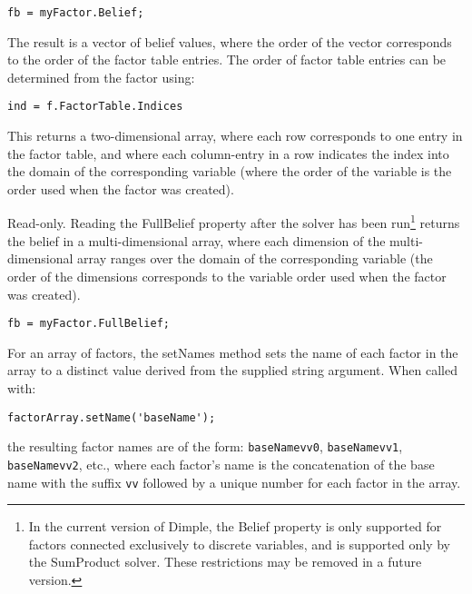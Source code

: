 \begin{lstlisting}
fb = myFactor.Belief;
\end{lstlisting}

The result is a vector of belief values, where the order of the vector corresponds to the order of the factor table entries.  The order of factor table entries can be determined from the factor using:

\begin{lstlisting}
ind = f.FactorTable.Indices
\end{lstlisting}

This returns a two-dimensional array, where each row corresponds to one entry in the factor table, and where each column-entry in a row indicates the index into the domain of the corresponding variable (where the order of the variable is the order used when the factor was created).


\label{sec:Factor.FullBelief}

Read-only.  Reading the FullBelief property after the solver has been run\footnote{In the current version of Dimple, the Belief property is only supported for factors connected exclusively to discrete variables, and is supported only by the SumProduct solver.  These restrictions may be removed in a future version.} returns the belief in a multi-dimensional array, where each dimension of the multi-dimensional array ranges over the domain of the corresponding variable (the order of the dimensions corresponds to the variable order used when the factor was created).

\begin{lstlisting}
fb = myFactor.FullBelief;
\end{lstlisting}



\label{sec:Factor.setNames}

For an array of factors, the setNames method sets the name of each factor in the array to a distinct value derived from the supplied string argument.  When called with:

\begin{lstlisting}
factorArray.setName('baseName');
\end{lstlisting}

the resulting factor names are of the form: \texttt{baseName\textunderscore vv0}, \texttt{baseName\textunderscore vv1}, \texttt{baseName\textunderscore vv2}, etc., where each factor's name is the concatenation of the base name with the suffix \texttt{\textunderscore vv} followed by a unique number for each factor in the array.







